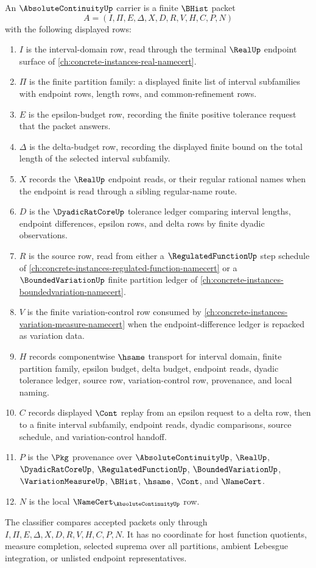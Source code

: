 \begin{definition}
\label{def:absolute-continuity-carrier}
An $\AbsoluteContinuityUp$ carrier is a finite $\BHist$ packet
$$
A=(I,\Pi,E,\Delta,X,D,R,V,H,C,P,N)
$$
with the following displayed rows:
\begin{enumerate}
\item $I$ is the interval-domain row, read through the terminal $\RealUp$ endpoint surface of \autoref{ch:concrete-instances-real-namecert}.
\item $\Pi$ is the finite partition family: a displayed finite list of interval subfamilies with endpoint rows, length rows, and common-refinement rows.
\item $E$ is the epsilon-budget row, recording the finite positive tolerance request that the packet answers.
\item $\Delta$ is the delta-budget row, recording the displayed finite bound on the total length of the selected interval subfamily.
\item $X$ records the $\RealUp$ endpoint reads, or their regular rational names when the endpoint is read through a sibling regular-name route.
\item $D$ is the $\DyadicRatCoreUp$ tolerance ledger comparing interval lengths, endpoint differences, epsilon rows, and delta rows by finite dyadic observations.
\item $R$ is the source row, read from either a $\RegulatedFunctionUp$ step schedule of \autoref{ch:concrete-instances-regulated-function-namecert} or a $\BoundedVariationUp$ finite partition ledger of \autoref{ch:concrete-instances-boundedvariation-namecert}.
\item $V$ is the finite variation-control row consumed by \autoref{ch:concrete-instances-variation-measure-namecert} when the endpoint-difference ledger is repacked as variation data.
\item $H$ records componentwise $\hsame$ transport for interval domain, finite partition family, epsilon budget, delta budget, endpoint reads, dyadic tolerance ledger, source row, variation-control row, provenance, and local naming.
\item $C$ records displayed $\Cont$ replay from an epsilon request to a delta row, then to a finite interval subfamily, endpoint reads, dyadic comparisons, source schedule, and variation-control handoff.
\item $P$ is the $\Pkg$ provenance over $\AbsoluteContinuityUp$, $\RealUp$, $\DyadicRatCoreUp$, $\RegulatedFunctionUp$, $\BoundedVariationUp$, $\VariationMeasureUp$, $\BHist$, $\hsame$, $\Cont$, and $\NameCert$.
\item $N$ is the local $\NameCert_{\AbsoluteContinuityUp}$ row.
\end{enumerate}
The classifier compares accepted packets only through $I,\Pi,E,\Delta,X,D,R,V,H,C,P,N$. It has no coordinate for host function quotients, measure completion, selected suprema over all partitions, ambient Lebesgue integration, or unlisted endpoint representatives.
\end{definition}


